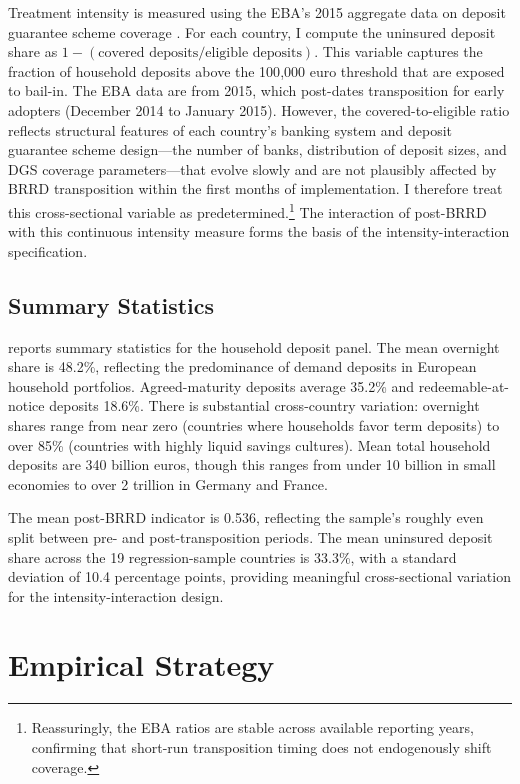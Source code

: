 \documentclass[12pt]{article}
\begin{document}
Treatment intensity is measured using the EBA's 2015 aggregate data on deposit guarantee scheme coverage \citep{eba2015dgs}. For each country, I compute the uninsured deposit share as $1 - (\text{covered deposits} / \text{eligible deposits})$. This variable captures the fraction of household deposits above the 100{,}000 euro threshold that are exposed to bail-in. The EBA data are from 2015, which post-dates transposition for early adopters (December 2014 to January 2015). However, the covered-to-eligible ratio reflects structural features of each country's banking system and deposit guarantee scheme design---the number of banks, distribution of deposit sizes, and DGS coverage parameters---that evolve slowly and are not plausibly affected by BRRD transposition within the first months of implementation. I therefore treat this cross-sectional variable as predetermined.\footnote{Reassuringly, the EBA ratios are stable across available reporting years, confirming that short-run transposition timing does not endogenously shift coverage.} The interaction of post-BRRD with this continuous intensity measure forms the basis of the intensity-interaction specification.

\subsection{Summary Statistics}



 reports summary statistics for the household deposit panel. The mean overnight share is 48.2\%, reflecting the predominance of demand deposits in European household portfolios. Agreed-maturity deposits average 35.2\% and redeemable-at-notice deposits 18.6\%. There is substantial cross-country variation: overnight shares range from near zero (countries where households favor term deposits) to over 85\% (countries with highly liquid savings cultures). Mean total household deposits are 340 billion euros, though this ranges from under 10 billion in small economies to over 2 trillion in Germany and France.

The mean post-BRRD indicator is 0.536, reflecting the sample's roughly even split between pre- and post-transposition periods. The mean uninsured deposit share across the 19 regression-sample countries is 33.3\%, with a standard deviation of 10.4 percentage points, providing meaningful cross-sectional variation for the intensity-interaction design.


\section{Empirical Strategy}
\end{document}
